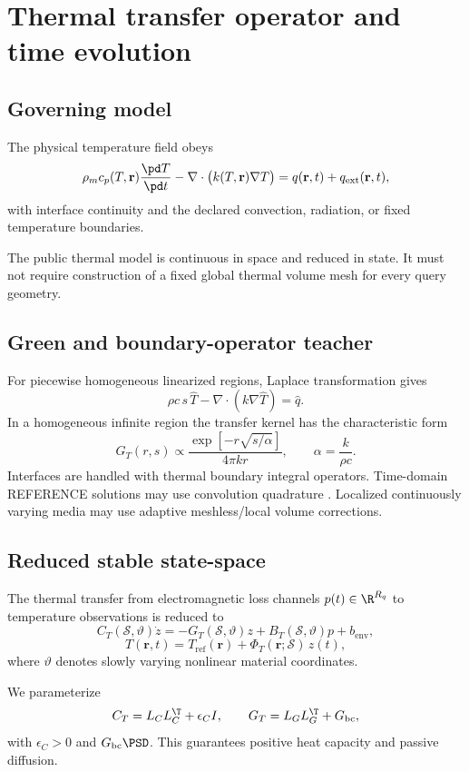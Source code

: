 \section{Thermal transfer operator and time evolution}

\subsection{Governing model}

The physical temperature field obeys
\[
 \rho_m c_p(T,\mathbf r)\frac{\pd T}{\pd t}
 -\nabla\cdot\big(k(T,\mathbf r)\nabla T\big)
 =q(\mathbf r,t)+q_{\mathrm{ext}}(\mathbf r,t),
\]
with interface continuity and the declared convection, radiation, or fixed
temperature boundaries.

The public thermal model is continuous in space and reduced in state. It must
not require construction of a fixed global thermal volume mesh for every query
geometry.

\subsection{Green and boundary-operator teacher}

For piecewise homogeneous linearized regions, Laplace transformation gives
\[
  \rho c\,s\,\widehat T-\nabla\cdot(k\nabla\widehat T)=\widehat q.
\]
In a homogeneous infinite region the transfer kernel has the characteristic
form
\[
  G_T(r,s)
  \propto
  \frac{\exp[-r\sqrt{s/\alpha}]}{4\pi k r},
  \qquad \alpha=\frac{k}{\rho c}.
\]
Interfaces are handled with thermal boundary integral operators. Time-domain
REFERENCE solutions may use convolution quadrature
\cite{lubich1988cq}. Localized continuously varying media may use adaptive
meshless/local volume corrections.

\subsection{Reduced stable state-space}

The thermal transfer from electromagnetic loss channels $p(t)\in\R^{R_q}$ to
temperature observations is reduced to
\[
 C_T(\mathcal S,\vartheta)\dot z
 =
 -G_T(\mathcal S,\vartheta)z
 +B_T(\mathcal S,\vartheta)p
 +b_{\mathrm{env}},
\]
\[
 T(\mathbf r,t)
 =
 T_{\mathrm{ref}}(\mathbf r)
 +\Phi_T(\mathbf r;\mathcal S)\,z(t),
\]
where $\vartheta$ denotes slowly varying nonlinear material coordinates.

We parameterize
\[
  C_T=L_C L_C^\T+\epsilon_C I,\qquad
  G_T=L_G L_G^\T+G_{\mathrm{bc}},
\]
with $\epsilon_C>0$ and $G_{\mathrm{bc}}\PSD$. This guarantees positive heat
capacity and passive diffusion.


